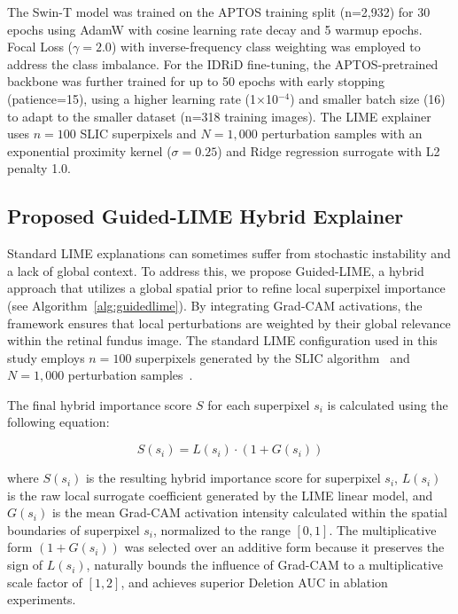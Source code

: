 \documentclass[10pt,twoside]{article}
\begin{document}
The Swin-T model was trained on the APTOS training split (n=2,932) for 30 epochs using AdamW with cosine learning rate decay and 5 warmup epochs. Focal Loss ($\gamma = 2.0$) with inverse-frequency class weighting was employed to address the class imbalance. For the IDRiD fine-tuning, the APTOS-pretrained backbone was further trained for up to 50 epochs with early stopping (patience=15), using a higher learning rate (1$\times$10$^{-4}$) and smaller batch size (16) to adapt to the smaller dataset (n=318 training images). The LIME explainer uses $n=100$ SLIC superpixels and $N=1{,}000$ perturbation samples with an exponential proximity kernel ($\sigma=0.25$) and Ridge regression surrogate with L2 penalty 1.0.

\subsection{Proposed Guided-LIME Hybrid Explainer}

Standard LIME explanations can sometimes suffer from stochastic instability and a lack of global context. To address this, we propose Guided-LIME, a hybrid approach that utilizes a global spatial prior to refine local superpixel importance (see Algorithm~\ref{alg:guidedlime}). By integrating Grad-CAM activations, the framework ensures that local perturbations are weighted by their global relevance within the retinal fundus image. The standard LIME configuration used in this study employs $n = 100$ superpixels generated by the SLIC algorithm~\cite{achanta2012slic} and $N = 1{,}000$ perturbation samples~\cite{ribeiro2016why}.

The final hybrid importance score $S$ for each superpixel $s_i$ is calculated using the following equation:

\begin{equation}
\label{eq:guidedlime}
S(s_i) = L(s_i) \cdot (1 + G(s_i))
\end{equation}

\noindent where $S(s_i)$ is the resulting hybrid importance score for superpixel $s_i$, $L(s_i)$ is the raw local surrogate coefficient generated by the LIME linear model, and $G(s_i)$ is the mean Grad-CAM activation intensity calculated within the spatial boundaries of superpixel $s_i$, normalized to the range $[0, 1]$. The multiplicative form $(1 + G(s_i))$ was selected over an additive form because it preserves the sign of $L(s_i)$, naturally bounds the influence of Grad-CAM to a multiplicative scale factor of $[1, 2]$, and achieves superior Deletion AUC in ablation experiments.
\end{document}
